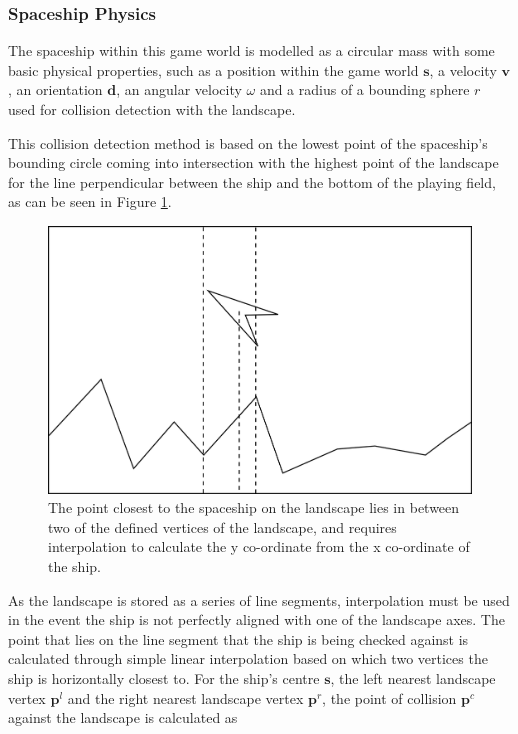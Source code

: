 \documentclass[conference]{IEEEtran}
\begin{document}
\subsubsection{Spaceship Physics}

The spaceship within this game world is modelled as a circular mass with some basic physical properties, such as a position within the game world $\bm {s}$, a velocity $\bm {v}$, an orientation $\bm{d}$, an angular velocity $\omega$ and a radius of a bounding sphere $r$ used for collision detection with the landscape.

This collision detection method is based on the lowest point of the spaceship's bounding circle coming into intersection with the highest point of the landscape for the line perpendicular between the ship and the bottom of the playing field, as can be seen in Figure \ref{fig:diagram_landscapepoint}.

\begin{figure}[hbtp]
\centering
\includegraphics[scale=0.4]{graphics/landscapepoint}
\caption{The point closest to the spaceship on the landscape lies in between two of the defined vertices of the landscape, and requires interpolation to calculate the y co-ordinate from the x co-ordinate of the ship.}
\label{fig:diagram_landscapepoint}
\end{figure}

As the landscape is stored as a series of line segments, interpolation must be used in the event the ship is not perfectly aligned with one of the landscape axes. The point that lies on the line segment that the ship is being checked against is calculated through simple linear interpolation based on which two vertices the ship is horizontally closest to. For the ship's centre $\bm {s}$, the left nearest landscape vertex $\bm {p}^{l}$ and the right nearest landscape vertex $\bm {p}^{r}$, the point of collision $\bm {p}^{c}$ against the landscape is calculated as 
\end{document}
